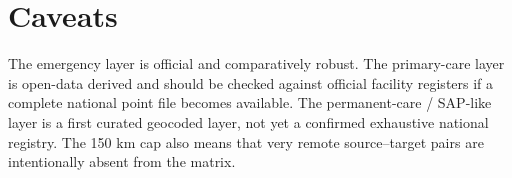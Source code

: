 \documentclass[11pt]{article}
\begin{document}
\section*{Caveats}
The emergency layer is official and comparatively robust. The primary-care layer is open-data derived and should be checked against official facility registers if a complete national point file becomes available. The permanent-care / SAP-like layer is a first curated geocoded layer, not yet a confirmed exhaustive national registry. The 150 km cap also means that very remote source--target pairs are intentionally absent from the matrix.
\end{document}
